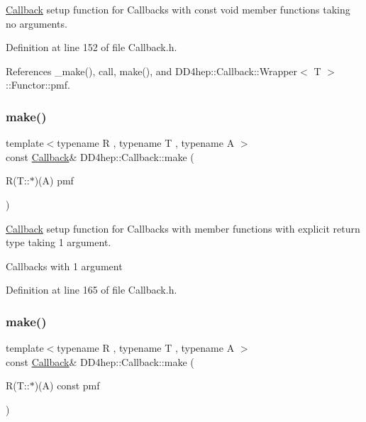 \hyperlink{class_d_d4hep_1_1_callback}{Callback} setup function for Callbacks with const void member functions taking no arguments. 



Definition at line 152 of file Callback.\+h.



References \+\_\+make(), call, make(), and D\+D4hep\+::\+Callback\+::\+Wrapper$<$ T $>$\+::\+Functor\+::pmf.

\hypertarget{class_d_d4hep_1_1_callback_abacbff587652ee2ae4bf2aa7e733a7e6}{}\label{class_d_d4hep_1_1_callback_abacbff587652ee2ae4bf2aa7e733a7e6} 
\subsubsection{\texorpdfstring{make()}{make()}\hspace{0.1cm}{\footnotesize\ttfamily [5/17]}}
{\footnotesize\ttfamily template$<$typename R , typename T , typename A $>$ \\
const \hyperlink{class_d_d4hep_1_1_callback}{Callback}\& D\+D4hep\+::\+Callback\+::make (\begin{DoxyParamCaption}\item[{R(T\+::$\ast$)(A)}]{pmf }\end{DoxyParamCaption})\hspace{0.3cm}{\ttfamily [inline]}}



\hyperlink{class_d_d4hep_1_1_callback}{Callback} setup function for Callbacks with member functions with explicit return type taking 1 argument. 

Callbacks with 1 argument 

Definition at line 165 of file Callback.\+h.

\hypertarget{class_d_d4hep_1_1_callback_ac35b72a21035b63b2c8474fd334524f5}{}\label{class_d_d4hep_1_1_callback_ac35b72a21035b63b2c8474fd334524f5} 
\subsubsection{\texorpdfstring{make()}{make()}\hspace{0.1cm}{\footnotesize\ttfamily [6/17]}}
{\footnotesize\ttfamily template$<$typename R , typename T , typename A $>$ \\
const \hyperlink{class_d_d4hep_1_1_callback}{Callback}\& D\+D4hep\+::\+Callback\+::make (\begin{DoxyParamCaption}\item[{R(T\+::$\ast$)(A) const}]{pmf }\end{DoxyParamCaption})\hspace{0.3cm}{\ttfamily [inline]}}



